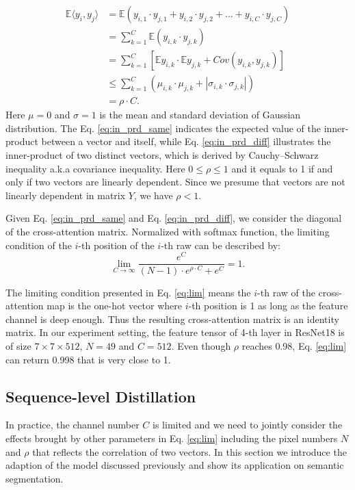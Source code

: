 \documentclass[10pt,twocolumn,letterpaper]{article}
\begin{document}
\begin{equation}
\label{eq:in_prd_diff}
    \begin{aligned}
       \mathbb{E}\langle y_i,y_j\rangle 
       &= \mathbb{E}(y_{i,1}\cdot y_{j,1}+y_{i,2}\cdot y_{j,2}+\dots+y_{i,C}\cdot y_{j,C}) \\
       &=\sum_{k=1}^{C}\mathbb{E}(y_{i,k}\cdot y_{j,k})\\
       &=\sum_{k=1}^C \left[ \mathbb{E}y_{i,k}\cdot \mathbb{E}y_{j,k}+Cov(y_{i,k},y_{j,k}) \right]  \\
       &\leq \sum_{k=1}^{C}(\mu_{i,k}\cdot \mu_{j,k}+|\sigma_{i,k}\cdot \sigma_{j,k}|)\\
       &=\rho \cdot C .
    \end{aligned}
\end{equation}
Here $\mu=0$ and $\sigma=1$ is the mean and standard deviation of Gaussian distribution. The Eq. \ref{eq:in_prd_same} indicates the expected value of the inner-product between a vector and itself, while Eq. \ref{eq:in_prd_diff} illustrates the inner-product of two distinct vectors, which is derived by Cauchy–Schwarz inequality a.k.a covariance inequality. Here $0\leq \rho \leq 1$ and it equals to 1 if and only if two vectors are linearly dependent. Since we presume that vectors are not linearly dependent in matrix $Y$, we have $\rho<1$.

Given Eq. \ref{eq:in_prd_same} and Eq. \ref{eq:in_prd_diff}, we consider the diagonal of the cross-attention matrix. Normalized with softmax function, the limiting condition of the $i$-th position of the $i$-th raw can be described by:
\begin{equation}
\label{eq:lim}
    \lim_{C\to \infty} \frac{e^C}{(N-1)\cdot e^{\rho\cdot C}+e^C}=1.
\end{equation}

The limiting condition presented in Eq. \ref{eq:lim} means the $i$-th raw of the cross-attention map is the one-hot vector where $i$-th position is 1 as long as the feature channel is deep enough. Thus the resulting cross-attention matrix is an identity matrix. In our experiment setting, the feature tensor of 4-th layer in ResNet18 is of size $7\times 7 \times 512$, \ie $N=49$ and $C=512$. Even though $\rho$ reaches 0.98, Eq. \ref{eq:lim} can return 0.998 that is very close to 1.  
\subsection{Sequence-level Distillation}
\label{sec:seq}
In practice, the channel number $C$ is limited and we need to jointly consider the effects brought by other parameters in Eq. \ref{eq:lim} including the pixel numbers $N$ and $\rho$ that reflects the correlation of two vectors. In this section we introduce the adaption of the model discussed previously and show its application on semantic segmentation.
\end{document}
